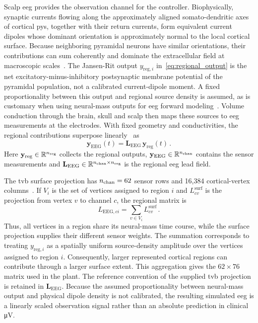 Scalp \ac{eeg} provides the observation channel for the controller.
Biophysically, synaptic currents flowing along the approximately aligned somato-dendritic axes of cortical \acp{py}, together with their return currents, form equivalent current dipoles whose dominant orientation is approximately normal to the local cortical surface.
Because neighboring pyramidal neurons have similar orientations, their contributions can sum coherently and dominate the extracellular field at macroscopic scales~\cite{Buzsaki2012}.
The Jansen-Rit output $y_{\mathrm{reg},i}$ in~\eqref{eq:regional_output} is the net excitatory-minus-inhibitory postsynaptic membrane potential of the pyramidal population, not a calibrated current-dipole moment.
A fixed proportionality between this output and regional source density is assumed, as is customary when using neural-mass outputs for \ac{eeg} forward modeling~\cite{Jansen1995,David2003}.
Volume conduction through the brain, skull and scalp then maps these sources to \ac{eeg} measurements at the electrodes.
With fixed geometry and conductivities, the regional contributions superpose linearly~\cite{SanzLeon2015} as
%
\begin{equation*}
    \mathbf{y}_\mathrm{EEG}(t)
    =\mathbf{L}_\mathrm{EEG}\,\mathbf{y}_\mathrm{reg}(t)\,.
\end{equation*}
%
Here $\mathbf{y}_\mathrm{reg}\in\mathbb{R}^{n_{\mathrm{reg}}{}}$ collects the regional outputs, $\mathbf{y}_\mathrm{EEG}\in\mathbb{R}^{n_{\mathrm{chan}}{}}$ contains the sensor measurements and $\mathbf{L}_\mathrm{EEG}\in\mathbb{R}^{n_{\mathrm{chan}}{}\times n_{\mathrm{reg}}{}}$ is the regional \ac{eeg} lead field.

The \ac{tvb} surface projection has $n_{\mathrm{chan}}{}=62$ sensor rows and 16,384 cortical-vertex columns~\cite{SanzLeon2013,SanzLeon2015}.
If $V_i$ is the set of vertices assigned to region $i$ and $L^{\mathrm{surf}}_{cv}$ is the projection from vertex $v$ to channel $c$, the regional matrix is
%
\begin{equation*}
    L_{\mathrm{EEG},ci}=\sum_{v\in V_i}L^{\mathrm{surf}}_{cv}\,.
\end{equation*}
%
Thus, all vertices in a region share its neural-mass time course, while the surface projection supplies their different sensor weights.
The summation corresponds to treating $y_{\mathrm{reg},i}$ as a spatially uniform source-density amplitude over the vertices assigned to region $i$. Consequently, larger represented cortical regions can contribute through a larger surface extent.
This aggregation gives the $62\times 76$ matrix used in the plant.
The reference convention of the supplied \ac{tvb} projection is retained in $\mathbf{L}_\mathrm{EEG}$.
Because the assumed proportionality between neural-mass output and physical dipole density is not calibrated, the resulting simulated \ac{eeg} is a linearly scaled observation signal rather than an absolute prediction in clinical \si{\micro\volt}.

